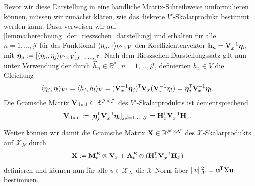 \documentclass[../main.tex]{subfiles}
\begin{document}
Bevor wir diese Darstellung in eine handliche Matrix-Schreibweise umformulieren können, müssen wir zunächst klären, wie das diskrete $V'$-Skalarprodukt bestimmt werden kann.
Dazu verweisen wir auf \cref{lemma:berechnung_der_rieszschen_darstellung} und erhalten für alle $n = 1, \dots, \mathcal J$ für das Funktional $\langle\eta_{n},{\mkern2mu\cdot\mkern2mu}\rangle_{V' \times V}$ den Koeffizientenvektor $\mathbf{h}_{n} = \mathbf{V}_{x}^{-1} \bm \eta_{n}$ mit $\bm \eta_{n} := [\langle\eta_{n},\eta_{j}\rangle_{V' \times V}]_{j = 1, \dots, \mathcal J}$.
Nach dem Rieszschen Darstellungssatz gilt nun unter Verwendung der durch $\vec{h}_{n} \in \mathbb{R}^{\mathcal J}$, $n = 1, \dots, \mathcal J$, definierten $h_n \in V$ die Gleichung
\begin{equation}
    \langle\eta_{j},\eta_{l}\rangle_{V'} = \langle h_{j},h_{l}\rangle_{V} = (\mathbf{V}_{x}^{-1} \bm \eta_{j})^{\mkern-1.5mu\mathsf{T}} \mathbf{V}_{x} (\mathbf{V}_{x}^{-1} \bm \eta_{l}) = \bm{\eta}_{j}^{\mkern-1.5mu\mathsf{T}} \mathbf{V}_{x}^{-1} \bm{\eta}_{l}.
\end{equation}
Die Gramsche Matrix $\mathbf{V}_{\mathrm{dual}} \in \mathbb{R}^{\mathcal J \times \mathcal J}$ des $V'$-Skalarprodukts ist dementsprechend
\begin{equation}
    \mathbf{V}_{\mathrm{dual}} := [\bm{\eta}_{j}^{\mkern-1.5mu\mathsf{T}} \mathbf{V}_{x}^{-1} \bm{\eta}_{l}]_{j,l = 1, \dots, \mathcal J} = \mathbf{H}_{x}^{\mkern-1.5mu\mathsf{T}} \mathbf{V}_{x}^{-1} \mathbf{H}_{x}.
\end{equation}

Weiter können wir damit die Gramsche Matrix $\mathbf{X} \in \mathbb{R}^{\mathcal N \times \mathcal N}$ des $\mathcal X$-Skalarprodukts auf $\mathcal X_{\mathcal N}$ durch
\begin{equation}
    \mathbf{X} := \mathbf{M}^{E}_{t} \otimes \mathbf{V}_{x} + \mathbf{A}^{E}_{t} \otimes (\mathbf{H}_{x}^{\mkern-1.5mu\mathsf{T}} \mathbf{V}_{x}^{-1} \mathbf{H}_{x})
\end{equation}
definieren und können nun für alle $u \in \mathcal X_{\mathcal N}$ die $\mathcal X$-Norm über $\lVert u\rVert_{\mathcal X}^{2} = \mathbf{u}^{\mkern-1.5mu\mathsf{T}} \mathbf{X} \mathbf{u}$ bestimmen.
\end{document}
